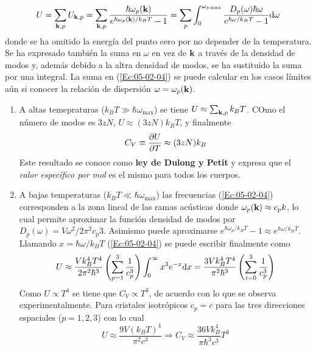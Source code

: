 \begin{equation}
    U = \sum_{\mathbf{k},p} U_{\mathbf{k},p} = \sum_{\mathbf{k},p} \frac{\hbar \omega_p (\mathbf{k})}{e^{\hbar \omega_p (\mathbf{k})/k_B T} - 1} = \sum_p \int_{0}^{\omega_{p \max}} \frac{D_p (\omega) \hbar \omega}{e^{\hbar \omega/ k_B T} - 1} \mathrm{d} \omega
\end{equation}
donde se ha omitido la energía del punto cero por no depender de la temperatura. Se ha expresado también la suma en $\omega$ en vez de $\mathbf{k}$ a través de la densidad de modos y, además debido a la altra densidad de modos, se ha sustituido la suma por una integral. La suma en (\ref{Ec:05-02-04}) se puede calcular en los casos límites aún si conocer la relación de dispersión $\omega=\omega_p (\mathbf{k})$. 

\begin{enumerate}
    \item A altas temepraturas ($k_BT \gg \hbar \omega_{\max}$) se tiene $U\approx \sum_{\mathbf{k},p} k_B T$. COmo el número de modos es $3zN$, $U\approx (3zN)k_B T$, y finalmente 
    \begin{equation}
        C_V \equiv \frac{\partial U}{\partial T} \approx (3zN)k_B
    \end{equation}
    Este resultado se conoce como \textbf{ley de Dulong y Petit} y expresa que el \textit{calor específico por mol} es el mismo para todos los cuerpos. 
    \item A bajas temperaturas ($k_B T \ll \hbar \omega_{\max}$) las frecuencias (\ref{Ec:05-02-04}) corresponden a la zona lineal de las ramas acústicas donde $\omega_p (\mathbf{k}) \approx c_p k$, lo cual permite aproximar la función densidad de modos por $D_p (\omega) = V \omega^2 / 2 \pi^2 c_p3$. Asimismo puede aproximarse $e^{\hbar \omega_p/ k_B T} - 1 \approx e^{\hbar \omega / k_B T}$. Llamando $x=\hbar \omega / k_B T$  (\ref{Ec:05-02-04}) se puede escribir finalmente como 
    \begin{equation}
        U \approx \frac{Vk_B^4T^4}{2 \pi^2 \hbar^3} \left( \sum_{p=1}^3 \frac{1}{c_p^3} \right) \int_0^\infty x^3 e^{-x} \mathrm{d} x = \frac{3Vk_B^4 T^4}{\pi^2 \hbar^3} \left( \sum_{i=0}^3 \frac{1}{c_p^3} \right)
    \end{equation}
    Como $U\propto T^4$ se tiene que $C_V \propto T^3$, de acuerdo con lo que se observa experimentalmente. Para cristales isotrópicos $c_p=c$ para las tres direcciones espaciales ($p=1,2,3$) con lo cual
    \begin{equation}
        U \approx \frac{9V(k_B T)^4}{\pi^2 c^3} \Rightarrow C_V \approx \frac{36Vk_B^4}{\pi \hbar^3 c^3} T^3
    \end{equation}

\end{enumerate}
